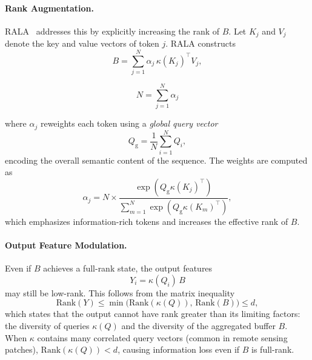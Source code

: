 \documentclass[runningheads]{llncs}
\begin{document}
\paragraph{Rank Augmentation.}
RALA~\cite{Fan2025RALA} addresses this by explicitly increasing the rank of
$B$. Let $K_j$ and $V_j$ denote the key and value vectors of token $j$.
RALA constructs
\begin{equation}
B=\sum_{j=1}^{N}\alpha_j\,\kappa(K_j)^\top V_j ,
\label{eq:rala_rank_aug}
\end{equation}

\begin{equation}
N=\sum_{j=1}^{N}\alpha_j
\label{eq:rala_alpha_aug}
\end{equation}

\noindent where $\alpha_j$ reweights each token using a \emph{global query
vector}
\begin{equation}
Q_{\mathrm{g}}=\frac{1}{N}\sum_{i=1}^N Q_i,
\label{eq:global_query}
\end{equation}
encoding the overall semantic content of the sequence. The weights are
computed as
\begin{equation}
\alpha_j=N \times \frac{\exp(Q_{\mathrm{g}}\kappa(K_j)^\top)}
{\sum_{m=1}^{N}\exp(Q_{\mathrm{g}}\kappa(K_m)^\top)},
\label{eq:alpha_softmax}
\end{equation}
which emphasizes information-rich tokens and increases the effective rank of $B$.

\paragraph{Output Feature Modulation.}
Even if $B$ achieves a full-rank state, the output features
\begin{equation}
Y_i=\kappa(Q_i)\,B
\label{eq:Y_pre_modulation}
\end{equation}
may still be low-rank.
This follows from the matrix inequality
\begin{equation}
\mathrm{Rank}(Y)\le \min\big(\mathrm{Rank}(\kappa(Q)),\,\mathrm{Rank}(B)\big)\le d,
\label{eq:rank_inequality}
\end{equation}
which states that the output cannot have rank greater than its limiting factors:
the diversity of queries \(\kappa(Q)\) and the diversity of the aggregated
buffer \(B\). When $\kappa$ contains many correlated query vectors (common in
remote sensing patches), $\mathrm{Rank}(\kappa(Q))<d$, causing information loss
even if $B$ is full-rank.
\end{document}
